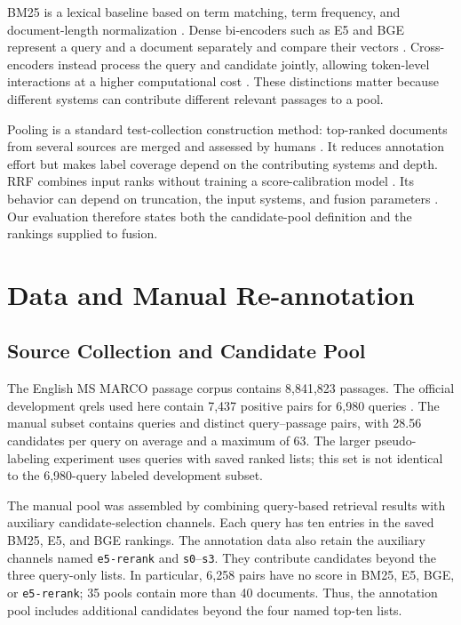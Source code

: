 \documentclass[runningheads,a4paper]{llncs}
\begin{document}
BM25 is a lexical baseline based on term matching, term frequency, and document-length normalization \cite{robertson2009bm25}. Dense bi-encoders such as E5 and BGE represent a query and a document separately and compare their vectors \cite{wang2022e5,xiao2023cpack}. Cross-encoders instead process the query and candidate jointly, allowing token-level interactions at a higher computational cost \cite{nogueira2019bert}. These distinctions matter because different systems can contribute different relevant passages to a pool.

Pooling is a standard test-collection construction method: top-ranked documents from several sources are merged and assessed by humans \cite{voorhees2005trec}. It reduces annotation effort but makes label coverage depend on the contributing systems and depth. RRF combines input ranks without training a score-calibration model \cite{cormack2009rrf}. Its behavior can depend on truncation, the input systems, and fusion parameters \cite{bruch2023fusion}. Our evaluation therefore states both the candidate-pool definition and the rankings supplied to fusion.

\section{Data and Manual Re-annotation}
\label{sec:data}

\subsection{Source Collection and Candidate Pool}

The English MS MARCO passage corpus contains 8,841,823 passages. The official development qrels used here contain 7,437 positive pairs for 6,980 queries \cite{msmarco_datasets}. The manual subset contains \ManualQueryCount{} queries and \ManualPairCount{} distinct query--passage pairs, with 28.56 candidates per query on average and a maximum of 63. The larger pseudo-labeling experiment uses \FullQueryCount{} queries with saved ranked lists; this set is not identical to the 6,980-query labeled development subset.

The manual pool was assembled by combining query-based retrieval results with auxiliary candidate-selection channels. Each query has ten entries in the saved BM25, E5, and BGE rankings. The annotation data also retain the auxiliary channels named \texttt{e5-rerank} and \texttt{s0}--\texttt{s3}. They contribute candidates beyond the three query-only lists. In particular, 6,258 pairs have no score in BM25, E5, BGE, or \texttt{e5-rerank}; 35 pools contain more than 40 documents. Thus, the annotation pool includes additional candidates beyond the four named top-ten lists.
\end{document}
